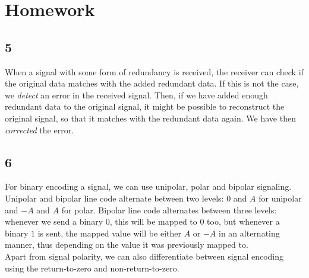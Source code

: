 \documentclass[11pt,titlepage]{report}
\begin{document}
\chapter{Homework}
\section{5}
When a signal with some form of redundancy is received, the receiver can check if the original data matches with the added redundant data. If this is not the case, we \emph{detect} an error in the received signal. Then, if we have added enough redundant data to the original signal, it might be possible to reconstruct the original signal, so that it matches with the redundant data again. We have then \emph{corrected} the error.

\section{6}
For binary encoding a signal, we can use unipolar, polar and bipolar signaling. Unipolar and bipolar line code alternate between two levels: $0$ and $A$ for unipolar and $-A$ and $A$ for polar. Bipolar line code alternates between three levels: whenever we send a binary $0$, this will be mapped to $0$ too, but whenever a binary $1$ is sent, the mapped value will be either $A$ or $-A$ in an alternating manner, thus depending on the value it was previously mapped to.
\\
Apart from signal polarity, we can also differentiate between signal encoding using the return-to-zero and non-return-to-zero.
\end{document}
